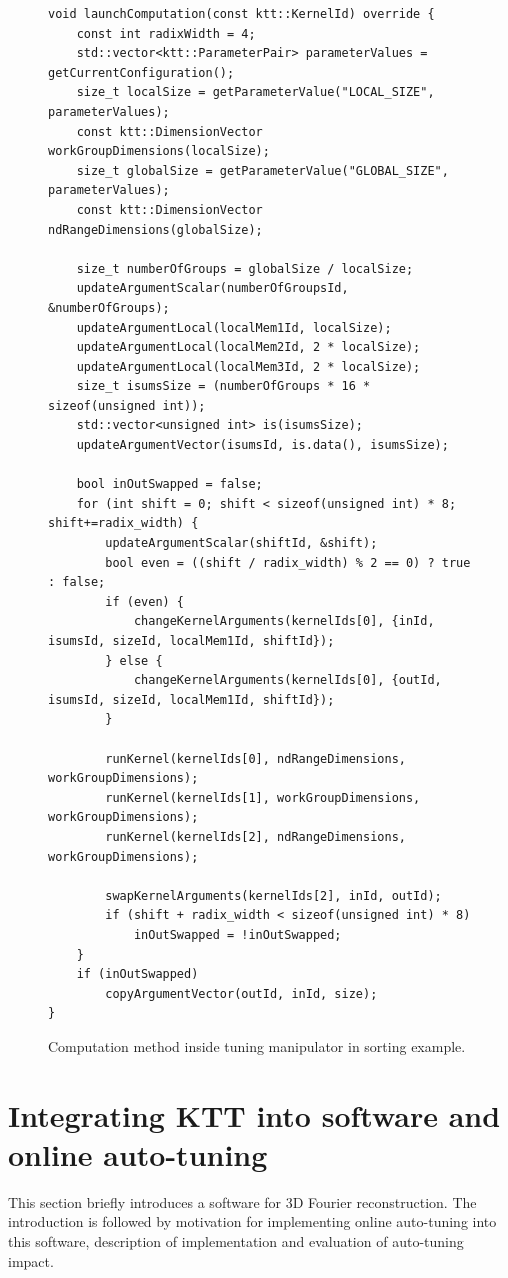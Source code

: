 \documentclass
[
    digital, %
    oneside, %
    table, %
    nolof, %
    nolot, %
    nocover %
]{fithesis3}
\begin{document}
\begin{figure}
\footnotesize
\begin{adjustwidth}{-1cm}{-1cm}
\begin{lstlisting}
void launchComputation(const ktt::KernelId) override {
    const int radixWidth = 4;
    std::vector<ktt::ParameterPair> parameterValues = getCurrentConfiguration();
    size_t localSize = getParameterValue("LOCAL_SIZE", parameterValues);
    const ktt::DimensionVector workGroupDimensions(localSize);
    size_t globalSize = getParameterValue("GLOBAL_SIZE", parameterValues);
    const ktt::DimensionVector ndRangeDimensions(globalSize);
    
    size_t numberOfGroups = globalSize / localSize;
    updateArgumentScalar(numberOfGroupsId, &numberOfGroups);
    updateArgumentLocal(localMem1Id, localSize);
    updateArgumentLocal(localMem2Id, 2 * localSize);
    updateArgumentLocal(localMem3Id, 2 * localSize);
    size_t isumsSize = (numberOfGroups * 16 * sizeof(unsigned int));
    std::vector<unsigned int> is(isumsSize);
    updateArgumentVector(isumsId, is.data(), isumsSize);
    
    bool inOutSwapped = false;
    for (int shift = 0; shift < sizeof(unsigned int) * 8; shift+=radix_width) {
        updateArgumentScalar(shiftId, &shift);
        bool even = ((shift / radix_width) % 2 == 0) ? true : false;
        if (even) {
            changeKernelArguments(kernelIds[0], {inId, isumsId, sizeId, localMem1Id, shiftId});
        } else {
            changeKernelArguments(kernelIds[0], {outId, isumsId, sizeId, localMem1Id, shiftId});
        }
        
        runKernel(kernelIds[0], ndRangeDimensions, workGroupDimensions);
        runKernel(kernelIds[1], workGroupDimensions, workGroupDimensions);
        runKernel(kernelIds[2], ndRangeDimensions, workGroupDimensions);
        
        swapKernelArguments(kernelIds[2], inId, outId);
        if (shift + radix_width < sizeof(unsigned int) * 8)
            inOutSwapped = !inOutSwapped;
    }
    if (inOutSwapped)
        copyArgumentVector(outId, inId, size);
}
\end{lstlisting}
\caption{Computation method inside tuning manipulator in sorting example.}
\label{sort-example-manipulator}
\end{adjustwidth}
\end{figure}

\section{Integrating KTT into software and online auto-tuning}
This section briefly introduces a software for 3D Fourier reconstruction. The introduction is followed by motivation for implementing online auto-tuning
into this software, description of implementation and evaluation of auto-tuning impact.
\end{document}
